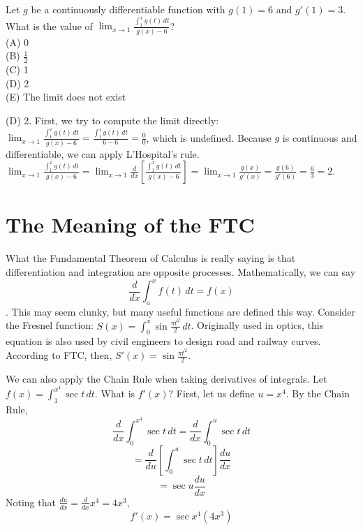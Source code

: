 \begin{Exercise} Let $g$ be a continuously 
differentiable function with $g(1) = 6$ and $g'(1) = 3$. What is the value of 
$\lim_{x \to 1} \frac{\int_1^x g(t)\,dt}{g(x) - 6}$?\\
(A) 0\\
(B) $\frac{1}{2}$\\
(C) 1\\
(D) 2\\
(E) The limit does not exist\\
\vspace{40mm}
\end{Exercise}

\begin{Answer}[ref = defint5]
(D) 2. First, we try to compute the limit directly: $\lim_{x \to 1} \frac{\int_
1^x g(t)\,dt}{g(x) - 6} = \frac{\int_1^1 g(t)\,dt}{6 - 6} = \frac{0}{0}$, 
which is undefined. Because $g$ is continuous and differentiable, we can apply 
L'Hospital's rule. $\lim_{x \to 1} \frac{\int_1^x g(t)\,dt}{g(x) - 6} = \lim_{
x \to 1} \frac{d}{dx} \left[ \frac{\int_1^x g(t)\,dt}{g(x) - 6} \right] = 
\lim_{x \to 1} \frac{g(x)}{g'(x)} = \frac{g(6)}{g'(6)} = \frac{6}{3} = 2$.
\end{Answer}


\section{The Meaning of the FTC}
What the Fundamental Theorem of Calculus is really saying is that 
differentiation and integration are opposite processes. Mathematically, 
we can say $$\frac{d}{dx} \int_{a}^{x} f(t)\,dt = f(x)$$.
This may seem clunky, but many useful functions are defined this way. 
Consider the Fresnel function: $S(x) = \int_{0}^{x}\sin{
\frac{\pi t^2}{2}}\,dt$. Originally used in optics, this equation is 
also used by civil engineers to design road and railway curves. 
According to FTC, then, $S'(x) = \sin{\frac{\pi t^2}{2}}$. 

We can also apply the Chain Rule when taking derivatives of integrals. 
Let $f(x) = \int_{1}^{x^4} \sec{t}\,dt$. What is $f'(x)$? First, let 
us define $u = x^4$. By the Chain Rule,
$$\frac{d}{dx}\int_{0}^{x^4} \sec{t}\,dt = \frac{d}{dx}\int_{0}^{u} 
\sec{t}\,dt$$ 
$$= \frac{d}{du}[\int_{0}^{u} \sec{t}\,dt]\frac{du}{dx}$$
$$ = \sec{u} \frac{du}{dx}$$
Noting that $\frac{du}{dx} = \frac{d}{dx}x^4 = 4x^3$, 
$$f'(x) = \sec{x^4}(4x^3)$$

